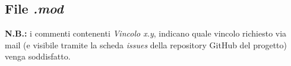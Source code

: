 \subsection{File \textit{.mod}}
\textbf{N.B.:} i commenti contenenti \textit{Vincolo x.y}, indicano quale vincolo richiesto via mail (e visibile tramite la scheda \textit{issues} della repository GitHub del progetto) venga soddisfatto.

